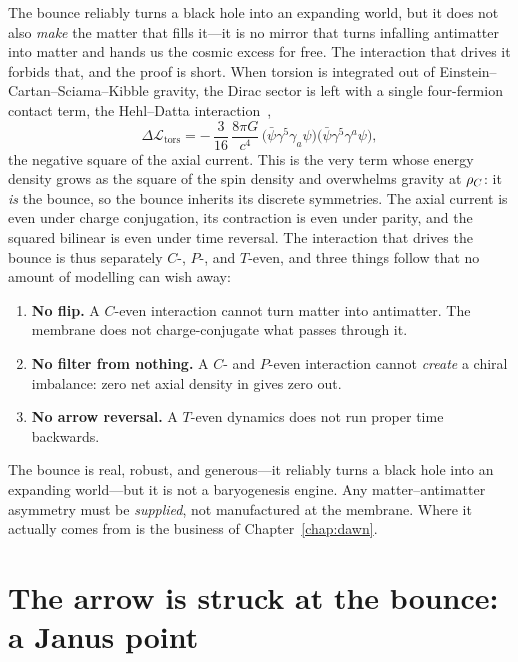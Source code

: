 The bounce reliably turns a black hole into an expanding world, but it does not
also \emph{make} the matter that fills it---it is no mirror that turns infalling
antimatter into matter and hands us the cosmic excess for free. The interaction
that drives it forbids that, and the proof is short. When torsion is integrated
out of Einstein--Cartan--Sciama--Kibble gravity, the Dirac sector is left with a
single four-fermion contact term, the Hehl--Datta interaction~\citep{hehl1976},
\[
  \Delta\mathcal{L}_{\mathrm{tors}}
  = -\,\frac{3}{16}\,\frac{8\pi G}{c^4}\,
    \big(\bar\psi\gamma^5\gamma_a\psi\big)\big(\bar\psi\gamma^5\gamma^a\psi\big),
\]
the negative square of the axial current. This is the very term whose energy
density grows as the square of the spin density and overwhelms gravity at $\rho_{C}$:
it \emph{is} the bounce, so the bounce inherits its discrete symmetries. The axial
current is even under charge conjugation, its contraction is even under parity,
and the squared bilinear is even under time reversal. The interaction that drives
the bounce is thus separately $C$-, $P$-, and $T$-even, and three things follow
that no amount of modelling can wish away:

\begin{enumerate}
  \item \textbf{No flip.} A $C$-even interaction cannot turn matter into
    antimatter. The membrane does not charge-conjugate what passes through it.
  \item \textbf{No filter from nothing.} A $C$- and $P$-even interaction cannot
    \emph{create} a chiral imbalance: zero net axial density in gives zero out.
  \item \textbf{No arrow reversal.} A $T$-even dynamics does not run proper time
    backwards.
\end{enumerate}

The bounce is real, robust, and generous---it reliably turns a black hole into an
expanding world---but it is not a baryogenesis engine. Any matter--antimatter
asymmetry must be \emph{supplied}, not manufactured at the membrane. Where it
actually comes from is the business of Chapter~\ref{chap:dawn}.

\section{The arrow is struck at the bounce: a Janus point}
\label{sec:janus}


